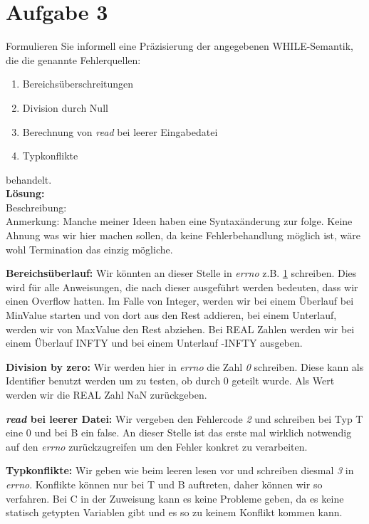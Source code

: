 \documentclass[11pt,a4paper,ngerman]{article}
\begin{document}

\section*{Aufgabe 3}

Formulieren Sie informell eine Präzisierung der angegebenen WHILE-Semantik, die die genannte Fehlerquellen:
\begin{enumerate}
	\item Bereichsüberschreitungen
	\item Division durch Null
	\item Berechnung von \emph{read} bei leerer Eingabedatei
	\item Typkonflikte
\end{enumerate}
behandelt.\\

\textbf{Lösung:}\\
Beschreibung:\\

Anmerkung: Manche meiner Ideen haben eine Syntaxänderung zur folge. Keine Ahnung was wir hier machen sollen, da keine Fehlerbehandlung möglich ist, wäre wohl Termination das einzig mögliche.

\begin{description}
	\item{\bfseries Bereichsüberlauf:} Wir könnten an dieser Stelle in \emph{errno} z.B. \underline{1} schreiben. Dies wird für alle Anweisungen, die nach 
		dieser ausgeführt werden bedeuten, dass wir einen Overflow hatten. Im Falle von Integer, werden wir bei einem Überlauf bei MinValue starten
		und von dort aus den Rest addieren, bei einem Unterlauf, werden wir von MaxValue den Rest abziehen. Bei REAL Zahlen werden wir bei einem
		Überlauf INFTY und bei einem Unterlauf -INFTY ausgeben.
	\item{\bfseries Division by zero:} Wir werden hier in \emph{errno} die Zahl \emph{0} schreiben. Diese kann als Identifier benutzt werden um zu testen,
		ob durch 0 geteilt wurde. Als Wert werden wir die REAL Zahl NaN zurückgeben.
	\item{\bfseries \emph{read} bei leerer Datei:} Wir vergeben den Fehlercode \emph{2} und schreiben bei Typ T eine 0 und bei B ein false. An dieser 
		Stelle ist das erste mal wirklich notwendig auf den \emph{errno} zurückzugreifen um den Fehler konkret zu verarbeiten.
	\item{\bfseries Typkonflikte:} Wir geben wie beim leeren lesen vor und schreiben diesmal \emph{3} in \emph{errno}. Konflikte können nur bei T und B 			auftreten, daher können wir so verfahren. Bei C in der Zuweisung kann es keine Probleme geben, da es keine statisch getypten Variablen gibt
		und es so zu keinem Konflikt kommen kann.
\end{description}

\label{LastPage}
\end{document}
